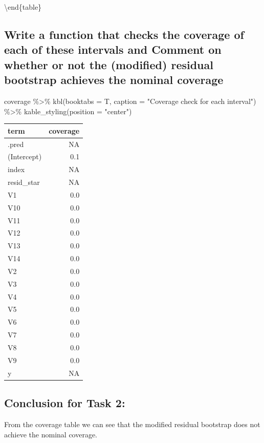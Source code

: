 \documentclass[
]{article}
\newenvironment{Shaded}{\begin{snugshade}}{\end{snugshade}}
\newcommand{\AttributeTok}[1]{\textcolor[rgb]{0.77,0.63,0.00}{#1}}
\newcommand{\FunctionTok}[1]{\textcolor[rgb]{0.00,0.00,0.00}{#1}}
\newcommand{\NormalTok}[1]{#1}
\newcommand{\SpecialCharTok}[1]{\textcolor[rgb]{0.00,0.00,0.00}{#1}}
\newcommand{\StringTok}[1]{\textcolor[rgb]{0.31,0.60,0.02}{#1}}
\begin{document}
\textbackslash end\{table\}

\hypertarget{write-a-function-that-checks-the-coverage-of-each-of-these-intervals-and-comment-on-whether-or-not-the-modified-residual-bootstrap-achieves-the-nominal-coverage}{%
\subsection{Write a function that checks the coverage of each of these
intervals and Comment on whether or not the (modified) residual
bootstrap achieves the nominal
coverage}\label{write-a-function-that-checks-the-coverage-of-each-of-these-intervals-and-comment-on-whether-or-not-the-modified-residual-bootstrap-achieves-the-nominal-coverage}}

\begin{Shaded}
\begin{Highlighting}[]
\NormalTok{coverage }\SpecialCharTok{\%\textgreater{}\%}
  \FunctionTok{kbl}\NormalTok{(}\AttributeTok{booktabs =}\NormalTok{ T,}
      \AttributeTok{caption =} \StringTok{"Coverage check for each interval"}\NormalTok{) }\SpecialCharTok{\%\textgreater{}\%}
  \FunctionTok{kable\_styling}\NormalTok{(}\AttributeTok{position =} \StringTok{"center"}\NormalTok{)}
\end{Highlighting}
\end{Shaded}

\begin{table}
\caption{\label{tab:unnamed-chunk-25}Coverage check for each interval}
\begin{table}

\centering
\begin{tabular}[t]{lr}
\toprule
term & coverage\\
\midrule
.pred & NA\\
(Intercept) & 0.1\\
index & NA\\
resid\_star & NA\\
V1 & 0.0\\
\addlinespace
V10 & 0.0\\
V11 & 0.0\\
V12 & 0.0\\
V13 & 0.0\\
V14 & 0.0\\
\addlinespace
V2 & 0.0\\
V3 & 0.0\\
V4 & 0.0\\
V5 & 0.0\\
V6 & 0.0\\
\addlinespace
V7 & 0.0\\
V8 & 0.0\\
V9 & 0.0\\
y & NA\\
\bottomrule
\end{tabular}
\end{table}
\end{table}

\hypertarget{conclusion-for-task-2}{%
\subsection{Conclusion for Task 2:}\label{conclusion-for-task-2}}

From the coverage table we can see that the modified residual bootstrap
does not achieve the nominal coverage.
\end{document}
